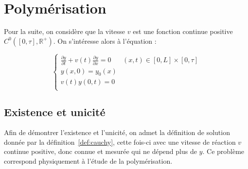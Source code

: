 \documentclass[a4paper]{article}
\begin{document}
\section{Polymérisation }

Pour la suite, on considère que la vitesse $v$ est une fonction continue positive $C^0([0,\tau],\mathbb{R}^+)$.
On s'intéresse alors à l'équation :

\begin{equation}
		\label{eq:pol}
		\begin{cases}
			\displaystyle \frac{\partial y}{\partial t}+ v(t) \frac{\partial y} {\partial x}  = 0 & (x,t) \in [0,L] \times [0, \tau] \\
             y(x,0) = y_{0} (x) \\
			 v(t)y(0,t) = 0 \\
		\end{cases}
\end{equation}

\subsection{Existence et unicité}

Afin de démontrer l'existence et l'unicité, on admet la définition de solution donnée par la définition~\ref{def:cauchy}, 
cette fois-ci avec une vitesse de réaction $v$ continue positive, donc connue et mesurée
qui ne dépend plus de $y$. 
Ce problème correspond physiquement à l'étude de la polymérisation.
\end{document}
